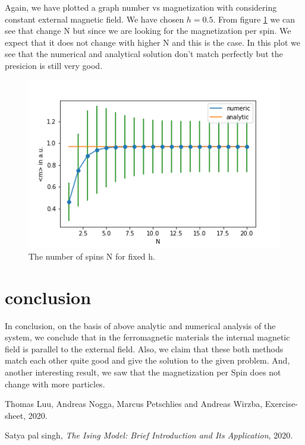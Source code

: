 \documentclass[11pt, a4paper, DIV=12]{scrartcl}
\begin{document}
Again, we have plotted a graph number vs magnetization with considering constant external magnetic field. We have chosen $h= 0.5$. From figure \ref{fig:hconst} we can see that change N but since we are looking for the magnetization per spin. We expect that it does not change with higher N and this is the case. In this plot we see that the numerical and analytical solution don't match perfectly but the presicion is still very good. 
   \begin{figure}[H]
   	\centering
   	\includegraphics[width=0.8\linewidth]{hconst.png}
   	\caption{The number of spins N for fixed h.}
   	\label{fig:hconst}
   \end{figure}
\section{conclusion}
In conclusion, on the basis of above analytic and numerical analysis of the system, we conclude that in the ferromagnetic materials the internal magnetic field is parallel to the external field. Also, we claim that these both methods match each other quite good and give the solution to the given problem. And, another interesting result, we saw that the magnetization per Spin does not change with more particles.  
\begin{thebibliography}{12}
	Thomas Luu, Andreas Nogga, Marcus Petschlies and  Andreas Wirzba, Exercise-sheet, 2020. 
		
	Satya pal singh, \textit{The Ising Model: Brief Introduction and Its Application}, 2020.
	
\end{thebibliography}
\end{document}
